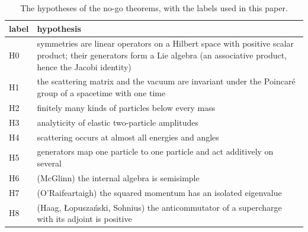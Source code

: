 \begin{table}[t]
\caption{The hypotheses of the no-go theorems, with the labels used in this paper.}
\label{tab:hypotheses}
\begin{ruledtabular}
\begin{tabular}{l>{\raggedright\arraybackslash}p{}}
label & hypothesis\\
\hline
H0 & symmetries are linear operators on a Hilbert space with positive scalar product; their generators form a Lie algebra (an associative product, hence the Jacobi identity)\\
H1 & the scattering matrix and the vacuum are invariant under the Poincar\'e group of a spacetime with one time\\
H2 & finitely many kinds of particles below every mass\\
H3 & analyticity of elastic two-particle amplitudes\\
H4 & scattering occurs at almost all energies and angles\\
H5 & generators map one particle to one particle and act additively on several\\
H6 & (McGlinn) the internal algebra is semisimple\\
H7 & (O'Raifeartaigh) the squared momentum has an isolated eigenvalue\\
H8 & (Haag, {\L}opusza\'nski, Sohnius) the anticommutator of a supercharge with its adjoint is positive\\
\end{tabular}
\end{ruledtabular}
\end{table}

